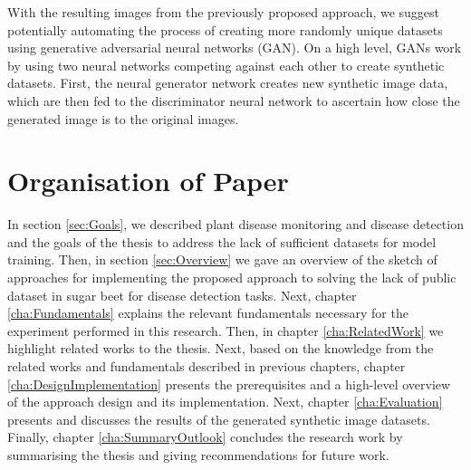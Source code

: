With the resulting images from the previously proposed approach, we suggest potentially automating the process of creating more randomly unique datasets using generative adversarial neural networks (GAN). On a high level, GANs work by using two neural networks competing against each other to create synthetic datasets. First, the neural generator network creates new synthetic image data, which are then fed to the discriminator neural network to ascertain how close the generated image is to the original images.

\section{Organisation of Paper}

In section \ref{sec:Goals}, we described plant disease monitoring and disease detection and the goals of the thesis to address the lack of sufficient datasets for model training. Then, in section \ref{sec:Overview} we gave an overview of the sketch of approaches for implementing the proposed approach to solving the lack of public dataset in sugar beet for disease detection tasks. Next, chapter \ref{cha:Fundamentals} explains the relevant fundamentals necessary for the experiment performed in this research. Then, in chapter \ref{cha:RelatedWork} we highlight related works to the thesis. Next, based on the knowledge from the related works and fundamentals described in previous chapters, chapter \ref{cha:DesignImplementation} presents the prerequisites and a high-level overview of the approach design and its implementation. Next, chapter \ref{cha:Evaluation} presents and discusses the results of the generated synthetic image datasets. Finally, chapter \ref{cha:SummaryOutlook} concludes the research work by summarising the thesis and giving recommendations for future work. 

    



